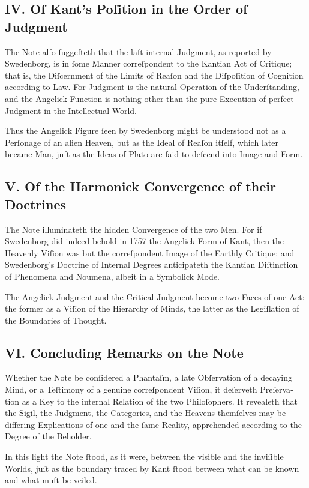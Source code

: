 \documentclass[12pt]{article}
\begin{document}
\subsection*{IV. Of Kant’s Poſition in the Order of Judgment}
The Note alſo ſuggeſteth that the laſt internal Judgment, as reported by 
Swedenborg, is in ſome Manner correſpondent to the Kantian Act of Critique; 
that is, the Diſcernment of the Limits of Reaſon and the Diſpoſition of 
Cognition according to Law. For Judgment is the natural Operation of the 
Underſtanding, and the Angelick Function is nothing other than the pure 
Execution of perfect Judgment in the Intellectual World.

Thus the Angelick Figure ſeen by Swedenborg might be understood not as a 
Perſonage of an alien Heaven, but as the Ideal of Reaſon itſelf, which later 
became Man, juſt as the Ideas of Plato are ſaid to deſcend into Image and 
Form.

\subsection*{V. Of the Harmonick Convergence of their Doctrines}
The Note illuminateth the hidden Convergence of the two Men. For if 
Swedenborg did indeed behold in 1757 the Angelick Form of Kant, then the 
Heavenly Viſion was but the correſpondent Image of the Earthly Critique; and 
Swedenborg’s Doctrine of Inter­nal Degrees anticipateth the Kantian 
Diſtinction of Phenomena and Noumena, albeit in a Symbolick Mode.

The Angelick Judgment and the Critical Judgment become two Faces of one Act: 
the former as a Viſion of the Hierarchy of Minds, the latter as the 
Legiſlation of the Boundaries of Thought.

\subsection*{VI. Concluding Remarks on the Note}
Whether the Note be conſidered a Phantaſm, a late Obſervation of a decaying 
Mind, or a Teſtimony of a genuine correſpondent Viſion, it deſerveth Preſerva­
tion as a Key to the internal Relation of the two Philoſophers. It re­vealeth 
that the Sigil, the Judgment, the Categories, and the Heavens themſelves may 
be differing Explications of one and the ſame Reality, apprehended according 
to the Degree of the Beholder.

In this light the Note ſtood, as it were, between the visible and the 
inviſible Worlds, juſt as the boundary traced by Kant ſtood between what can 
be known and what muſt be veiled.
\end{document}

